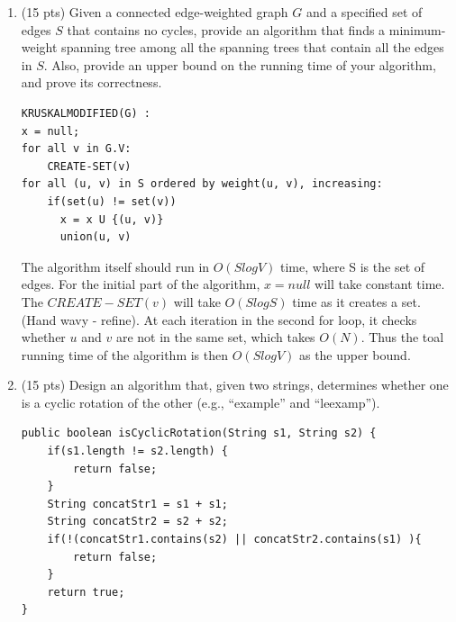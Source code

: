 \documentclass{article}
\begin{document}
\begin{enumerate}
\item (15 pts) Given a connected edge-weighted graph $G$ and a specified set of edges $S$ that contains no cycles, provide an algorithm that finds a minimum-weight spanning tree among all the spanning trees that contain all the edges in $S$. Also, provide an upper bound on the running time of your algorithm, and prove its correctness.

\begin{lstlisting}
KRUSKALMODIFIED(G) :
x = null;
for all v in G.V:
    CREATE-SET(v)
for all (u, v) in S ordered by weight(u, v), increasing:
    if(set(u) != set(v))
      x = x U {(u, v)}
      union(u, v)
\end{lstlisting}
The algorithm itself should run in $O(S log V)$ time, where S is the set of edges. For the initial part of the algorithm, $x = null$ will take constant time. The $CREATE-SET(v)$ will take $O(SlogS)$ time as it creates a set. (Hand wavy - refine). At each iteration in the second for loop, it checks whether $u$ and $v$ are not in the same set, which takes $O(N)$. Thus the toal running time of the algorithm is then $O(SlogV)$ as the upper bound. 

\newpage

\item (15 pts) Design an algorithm that, given two strings, determines whether one is a cyclic rotation of the other (e.g., ``example'' and ``leexamp'').

\begin{lstlisting}
public boolean isCyclicRotation(String s1, String s2) {
	if(s1.length != s2.length) {
		return false;
	}
	String concatStr1 = s1 + s1;
	String concatStr2 = s2 + s2;
	if(!(concatStr1.contains(s2) || concatStr2.contains(s1) ){
		return false;
	}
	return true;
}
\end{lstlisting}

\end{enumerate}
\end{document}
